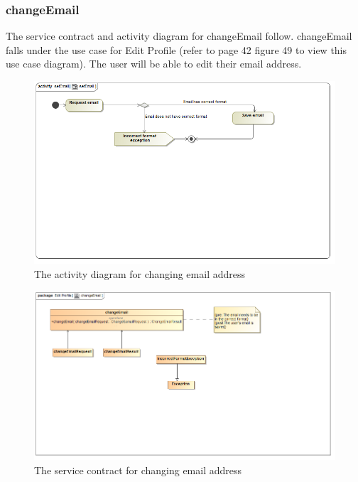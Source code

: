\documentclass[a4paper,12pt]{report}
\begin{document}
\subsubsection{changeEmail}
The service contract and activity diagram for changeEmail follow. changeEmail falls under the use case for Edit Profile (refer to page 42 figure 49 to view this use case diagram). The user will be able to edit their email address.
\begin{figure}[H]
  \centering
    \includegraphics[width=1.0\textwidth]{../Diagrams/ManageProfile/ActivityDiagrams/setEmail1.png} 
    \caption{The activity diagram for changing email address}
\end{figure}
	
\begin{figure}[H]
	\centering
	\includegraphics[width=1.0\textwidth]{../Diagrams/ManageProfile/serviceContracts/changeEmailServiceContract.png}
	\caption{The service contract for changing email address}
\end{figure}
\end{document}
